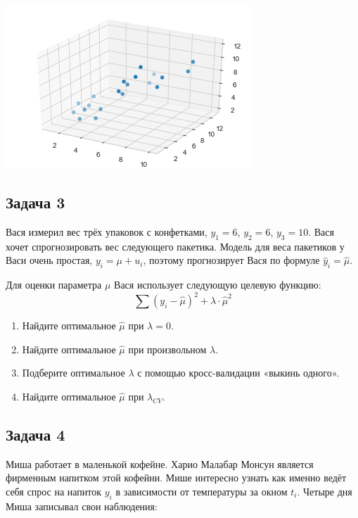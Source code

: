 \documentclass[12pt, a4paper, oneside]{article}
\begin{document}
\begin{center}
\includegraphics[scale=0.8]{regr_pic_5.png}
\end{center}


\subsection*{Задача 3}

Вася измерил вес трёх упаковок с конфетками,  $y_1=6$, $y_2=6$, $y_3=10$.  Вася хочет спрогнозировать вес следующего пакетика. Модель для веса пакетиков у Васи очень простая, $y_i = \mu + u_i$, поэтому прогнозирует Вася по формуле $\hat y_i = \hat \mu$.

Для оценки параметра $\mu$ Вася использует следующую целевую функцию:
\[
\sum (y_i - \hat \mu)^2 + \lambda \cdot \hat \mu^2
\]

\begin{enumerate}
	\item Найдите оптимальное $\hat\mu$ при $\lambda =0$.
	\item Найдите оптимальное $\hat\mu$ при произвольном $\lambda$.
	\item Подберите оптимальное $\lambda$ с помощью кросс-валидации «выкинь одного».
	\item Найдите оптимальное $\hat\mu$ при $\lambda_{CV}$.
\end{enumerate}




\subsection*{Задача 4}

Миша работает в маленькой кофейне. Харио Малабар Монсун является фирменным напитком этой кофейни. Мише интересно узнать как именно ведёт себя спрос на напиток $y_i$ в зависимости от температуры за окном $t_i$. Четыре дня Миша записывал свои наблюдения: 
\end{document}
